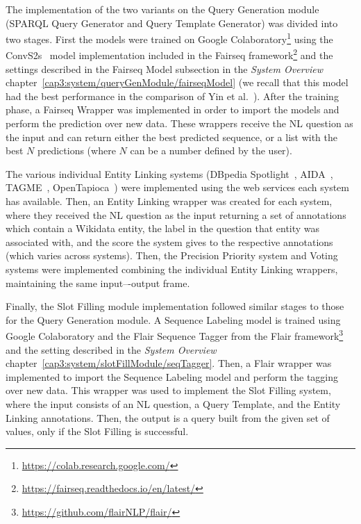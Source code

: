 The implementation of the two variants on the Query Generation module (SPARQL Query Generator 
and Query Template Generator) was divided into two stages. First the models were trained on 
Google Colaboratory\footnote{\url{https://colab.research.google.com/}} using the 
ConvS2s~\cite{nmt:convS2S-GehringAGYD17} model implementation included in the Fairseq 
framework\footnote{\url{https://fairseq.readthedocs.io/en/latest/}} and the settings described in the 
Fairseq Model subsection in the \textit{System Overview} chapter~\ref{cap3:system/queryGenModule/fairseqModel} 
(we recall that this model had 
the best performance in the comparison of Yin et al.~\cite{nmt:nl-to-sparql-Yin19}). After the 
training phase, a Fairseq Wrapper was implemented in order to import the models and perform the 
prediction over new data. These wrappers receive the NL question as the input and can return 
either the best predicted sequence, or a list with the best $N$ predictions (where $N$ can be a 
number defined by the user).

The various individual Entity Linking systems (DBpedia Spotlight~\cite{EL:dbpedia-spotlight-MendesJGB11}, 
AIDA~\cite{EL:aida-tool-YosefHBSW11, EL:aida-HoffartYBFPSTTW11}, TAGME~\cite{EL:tagme-FerraginaS10}, 
OpenTapioca~\cite{EL:opentapioca-Delpeuch19}) were implemented using the web services each system 
has available. Then, an Entity Linking wrapper was created for each system, where they received the 
NL question as the input returning a set of annotations which contain a Wikidata entity, the 
label in the question that entity was associated with, and the score the system gives to the 
respective annotations (which varies across systems). Then, the Precision Priority system and 
Voting systems were implemented combining the individual Entity Linking wrappers, maintaining 
the same input–-output frame.

Finally, the Slot Filling module implementation followed similar stages to those for the Query 
Generation module. A Sequence Labeling model is trained using Google Colaboratory and the Flair 
Sequence Tagger from the Flair framework\footnote{\url{https://github.com/flairNLP/flair/}} and 
the setting described in the \textit{System Overview} chapter~\ref{cap3:system/slotFillModule/seqTagger}. 
Then, a Flair wrapper was implemented to import the Sequence Labeling model and perform the 
tagging over new data. This wrapper was used to implement the Slot Filling system, where the 
input consists of an NL question, a Query Template, and the Entity Linking annotations. Then, 
the output is a \SPARQL{} query built from the given set of values, only if the Slot Filling is 
successful.

